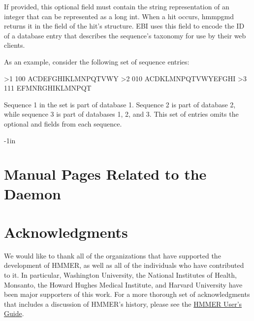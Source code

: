\documentclass[notoc,justified]{tufte-book}    %
\begin{document}
\begin{sreitems}{}
\item [\monob{taxonomy\_id}] If provided, this optional field must contain the string representation of an integer that can be represented as a long int.  When a hit occurs, hmmpgmd returns it in the  field of the hit's  structure.  EBI uses this field to encode the ID of a database entry that describes the sequence's taxonomy for use by their web clients.

\end{sreitems}

As an example, consider the following set of sequence entries:

\begin{sreoutput}
>1 100
ACDEFGHIKLMNPQTVWY
>2 010
ACDKLMNPQTVWYEFGHI
>3 111
EFMNRGHIKLMNPQT
\end{sreoutput}

Sequence 1 in the set is part of database 1.  Sequence 2 is part of database 2, while sequence 3 is part of databases 1, 2, and 3.  This set of entries omits the optional  and  fields from each sequence.




\begin{adjustwidth}{}{-1in}   
\chapter{Manual Pages Related to the Daemon}

\end{adjustwidth}

\chapter{Acknowledgments}
We would like to thank all of the organizations that have supported the development of HMMER, as well as all of the individuals who have contributed to it. In particular, Washington University, the National Institutes of Health, Monsanto, the Howard Hughes Medical Institute, and Harvard University have been major supporters of this work.  For a more thorough set of acknowledgments that includes a discussion of HMMER's history, please see the \underline{HMMER User's Guide}.

\label{manualend}

% 
\end{document}
